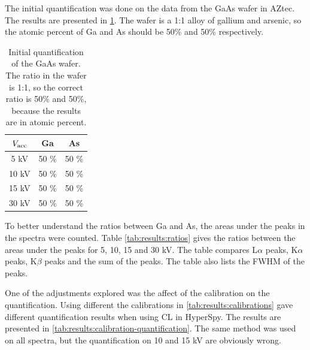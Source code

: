 The initial quantification was done on the data from the GaAs wafer in AZtec.
The results are presented in \cref{tab:initial_quantification}.
The wafer is a 1:1 alloy of gallium and arsenic, so the atomic percent of Ga and As should be 50\% and 50\% respectively.

\begin{table}[h]
    \centering
    \caption{
        Initial quantification of the GaAs wafer.
        The ratio in the wafer is 1:1, so the correct ratio is 50\% and 50\%, because the results are in atomic percent.
    }
    \label{tab:initial_quantification}
    \begin{tabular}{ccc}
        $V_\textnormal{acc}$ & Ga    & As    \\
        \hline
        5 kV                 & 50 \% & 50 \% \\
        10 kV                & 50 \% & 50 \% \\
        15 kV                & 50 \% & 50 \% \\
        30 kV                & 50 \% & 50 \%
    \end{tabular}
\end{table}

To better understand the ratios between Ga and As, the areas under the peaks in the spectra were counted.
Table \cref{tab:results:ratios} gives the ratios between the areas under the peaks for 5, 10, 15 and 30 kV.
The table compares L$\alpha$ peaks, K$\alpha$ peaks, K$\beta$ peaks and the sum of the peaks.
The table also lists the FWHM of the peaks.




One of the adjustments explored was the affect of the calibration on the quantification.
Using different the calibrations in \cref{tab:results:calibrations} gave different quantification results when using CL in HyperSpy. %
The results are presented in \cref{tab:results:calibration-quantification}.
The same method was used on all spectra, but the quantification on 10 and 15 kV are obviously wrong.








